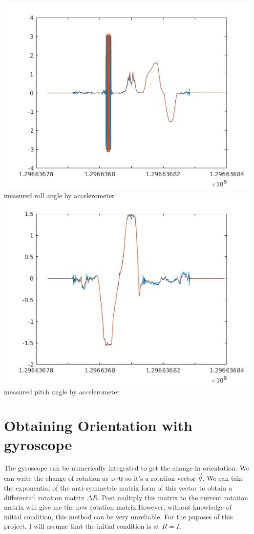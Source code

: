 \documentclass[english]{article}
\newcommand{\rotvec}{\overrightarrow{\theta}}
\begin{document}
\includegraphics[scale = 0.7]{roll_acc.jpg}\\
measured roll angle by accelerometer\\
\includegraphics[scale = 0.7]{pitch_acc.jpg}\\
measured pitch angle by accelerometer\\

\section*{Obtaining Orientation with gyroscope}
The gyroscope can be numerically integrated to get the change in orientation. We can write the change of rotation as $\omega \Delta t$ so it's a rotation vector $\rotvec$. We can take the exponential of the anti-symmetric matrix form of this vector to obtain a differentail rotation matrix $\Delta R$. Post multiply this matrix to the current rotation matrix will give me the new rotation matrix.However, without knowledge of initial condition, this method can be very unreliable. For the puposes of this project, I will assume that the initial condition is at $R=I$.\\\\
\end{document}
